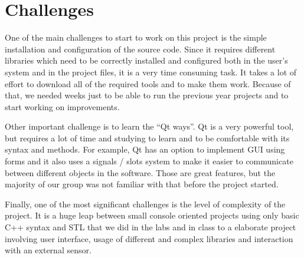 \documentclass[aps,letterpaper,11pt]{revtex4}
\begin{document}
\section{Challenges}
One of the main challenges to start to work on this project is the simple installation and configuration of the source code. Since it requires different libraries which need to be correctly installed and configured both in the user's system and in the project files, it is a very time consuming task. It takes a lot of effort to download all of the required tools and to make them work. Because of that, we needed weeks just to be able to run the previous year projects and to start working on improvements.\par
Other important challenge is to learn the “Qt ways”. Qt is a very powerful tool, but requires a lot of time and studying to learn and to be comfortable with its syntax and methods. For example, Qt has an option to implement GUI using forms and it also uses a signals / slots system to make it easier to communicate between different objects in the software. Those are great features, but the majority of our group was not familiar with that before the project started.\par
Finally, one of the most significant challenges is the level of complexity of the project. It is a huge leap between small console oriented projects using only basic C++ syntax and STL that we did in the labs and in class to a elaborate project involving user interface, usage of different and complex libraries and interaction with an external sensor.\par
\pagebreak
\end{document}
